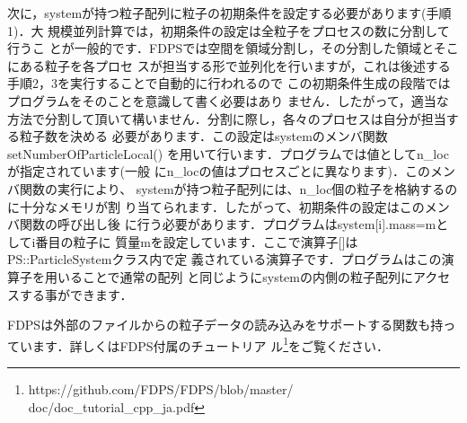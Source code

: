 \documentclass[twocolumn,10pt]{jarticle}
\begin{document}
次に，systemが持つ粒子配列に粒子の初期条件を設定する必要があります(手順1)．大
規模並列計算では，初期条件の設定は全粒子をプロセスの数に分割して行うこ
とが一般的です．FDPSでは空間を領域分割し，その分割した領域とそこにある粒子を各プロセ
スが担当する形で並列化を行いますが，これは後述する手順2，3を実行することで自動的に行われるので
この初期条件生成の段階ではプログラムをそのことを意識して書く必要はあり
ません．したがって，適当な方法で分割して頂いて構いません．分割に際し，各々のプロセスは自分が担当する粒子数を決める
必要があります．この設定はsystemのメンバ関数setNumberOfParticleLocal()
を用いて行います．プログラムでは値としてn\_locが指定されています(一般
にn\_locの値はプロセスごとに異なります)．このメンバ関数の実行により、
systemが持つ粒子配列には、n\_loc個の粒子を格納するのに十分なメモリが割
り当てられます．したがって、初期条件の設定はこのメンバ関数の呼び出し後
に行う必要があります．プログラムはsystem[i].mass=mとしてi番目の粒子に
質量mを設定しています．ここで演算子[]は PS::ParticleSystemクラス内で定
義されている演算子です．プログラムはこの演算子を用いることで通常の配列
と同じようにsystemの内側の粒子配列にアクセスする事ができます．

FDPSは外部のファイルからの粒子データの読み込みをサポートする関数も持っ
ています．詳しくはFDPS付属のチュートリア
ル\footnote{https://github.com/FDPS/FDPS/blob/master/
  doc/doc\_tutorial\_cpp\_ja.pdf}をご覧ください．
\end{document}
